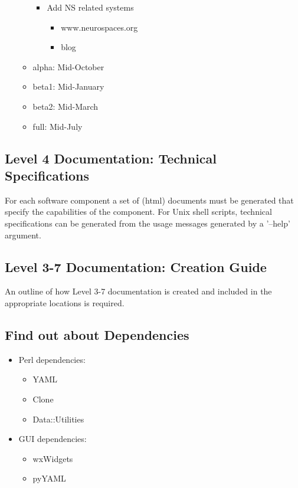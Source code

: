 \documentclass[12pt]{article}
\begin{document}
\begin{itemize}
\begin{itemize}
\begin{itemize}
    \item Add NS related systems
      \begin{itemize}
      \item www.neurospaces.org
      \item blog
      \end{itemize}
    \end{itemize}
  \item alpha: Mid-October
  \item beta1: Mid-January
  \item beta2: Mid-March
  \item full: Mid-July
  \end{itemize}
\end{itemize}

\subsection{Level 4 Documentation: Technical Specifications}

For each software component a set of (html) documents must be
generated that specify the capabilities of the component.  For Unix
shell scripts, technical specifications can be generated from the
usage messages generated by a '--help' argument.

\subsection{Level 3-7 Documentation: Creation Guide}

An outline of how Level 3-7 documentation is created and included in
the appropriate locations is required.


\subsection{Find out about Dependencies}

\begin{itemize}
\item Perl dependencies:
  \begin{itemize}
  \item YAML
  \item Clone
  \item Data::Utilities
  \end{itemize}
\item GUI dependencies:
  \begin{itemize}
  \item wxWidgets
  \item pyYAML
  \end{itemize}
\end{itemize}
\end{document}
